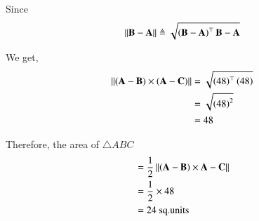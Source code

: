 \documentclass[journal,11pt]{IEEEtran}
\begin{document}
Since
\begin{align}
    \left\lVert\mathbf{B}-\mathbf{A}\right\rVert \triangleq \sqrt{\left(\mathbf{B}-\mathbf{A}\right)^{\top}{\mathbf{B}-\mathbf{A}}}
\end{align}

We get,
\begin{align}
    \left\lVert(\mathbf{A} - \mathbf{B})\times(\mathbf{A} - \mathbf{C})\right\rVert & = \sqrt{\left(48\right)^{\top}\left(48\right)} \\
                                                        & = \sqrt{\left(48\right)^{2}}             \\
                                                        & = 48
\end{align}

Therefore, the area of $\triangle ABC$
\begin{align}
     & = \frac{1}{2}\left\lVert{\ensuremath{\left(\mathbf{A}-\mathbf{B}\right)}\times {\mathbf{A}-\mathbf{C}}}\right\rVert \\
     & = \frac{1}{2}\times{48}                                              \\
     & = 24\ \text{sq.units}
\end{align}
\end{document}
